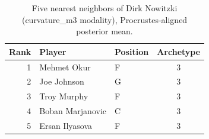 \begin{table}[htbp]
  \centering\small
  \begin{tabular}{rllc}
    \toprule
    Rank & Player & Position & Archetype \\
    \midrule
    1 & Mehmet Okur & F & 3 \\
    2 & Joe Johnson & G & 3 \\
    3 & Troy Murphy & F & 3 \\
    4 & Boban Marjanovic & C & 3 \\
    5 & Ersan Ilyasova & F & 3 \\
    \bottomrule
  \end{tabular}
  \caption{Five nearest neighbors of Dirk Nowitzki (curvature_m3 modality), Procrustes-aligned posterior mean.}
  \label{tab:Dirk_Nowitzki_neighbors_curvature_m3}
\end{table}

